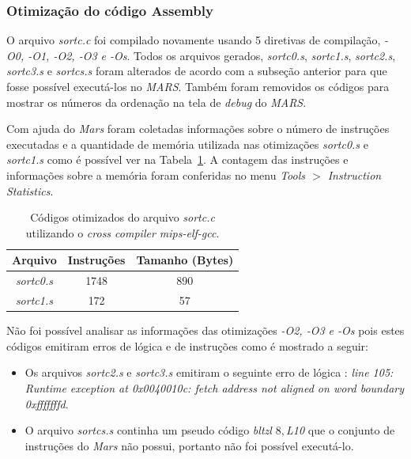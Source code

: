 \documentclass[12pt]{article}
\begin{document}
\subsubsection{Otimização do código Assembly}
\label{subsubsec:ot}

O arquivo \textit{sortc.c} foi compilado novamente usando 5 diretivas de compilação, \textit{-O0, -O1, -O2, -O3 e -Os}. Todos os arquivos gerados, \textit{sortc0.s}, \textit{sortc1.s}, \textit{sortc2.s}, \textit{sortc3.s} e \textit{sortcs.s} foram alterados de acordo com a subseção anterior para que fosse possível executá-los no \textit{MARS}. Também foram removidos os códigos para mostrar os números da ordenação na tela de \textit{debug} do \textit{MARS}.

Com ajuda do \textit{Mars} foram coletadas informações sobre o número de instruções executadas e a quantidade de memória utilizada nas otimizações \textit{sortc0.s} e \textit{sortc1.s} como é possível ver na Tabela~\ref{tab:opt}. A contagem das instruções e informações sobre a memória foram conferidas no menu \textit{Tools $>$ Instruction Statistics}. 

\begin{table}[H]
	\centering
	\begin{tabular}{|c|c|c|}
		\hline
		\textbf{Arquivo} & \textbf{Instruções} & \textbf{Tamanho (Bytes)} \\\hline
		\textit{sortc0.s} & 1748 & 890 \\\hline
		\textit{sortc1.s} & 172 & 57 \\\hline
	\end{tabular}
	\caption{Códigos otimizados do arquivo \textit{sortc.c} utilizando o \textit{cross compiler mips-elf-gcc}.}
	\label{tab:opt}
\end{table}

Não foi possível analisar as informações das otimizações \textit{-O2, -O3 e -Os} pois estes códigos emitiram erros de lógica e de instruções como é mostrado a seguir: 

\begin{itemize}
	\item Os arquivos \textit{sortc2.s} e \textit{sortc3.s} emitiram o seguinte erro de lógica : \textit{line 105: Runtime exception at 0x0040010c: fetch address not aligned on word boundary 0xfffffffd}.
	\item O arquivo \textit{sortcs.s} continha um pseudo código \textit{bltzl $8,$L10} que o conjunto de instruções do \textit{Mars} não possui, portanto não foi possível executá-lo.
\end{itemize}
\end{document}
